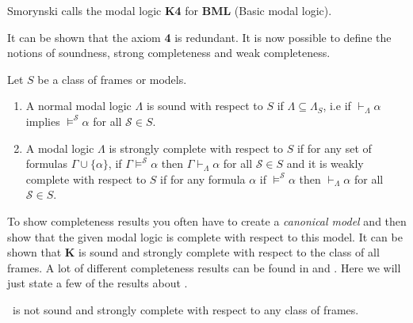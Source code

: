 \documentclass[../main.tex]{subfiles}
\begin{document}
\begin{remark}
	Smorynski calls the modal logic \textbf{K4} for \textbf{BML} (Basic
	modal logic).
\end{remark}


It can be shown that the axiom \textbf{4} is redundant.
It is now possible to define the notions of soundness, strong completeness and
weak completeness.
\begin{defi}
	Let $S$ be a class of frames or models.
	\begin{enumerate}
		\item A normal modal logic $\Lambda$ is sound with respect to $S$ if
		$\Lambda\subseteq\Lambda_S$, i.e if $\vdash_\Lambda\alpha$
		implies $\vDash^\mathcal{S}\alpha$ for all $\mathcal{S}\in S$.
	\item A modal logic $\Lambda$ is strongly complete with respect to $S$
		if for any set of formulas $\Gamma\cup\{\alpha\}$, if
		$\Gamma\vDash^\mathcal{S}\alpha$ then
		$\Gamma\vdash_\Lambda\alpha$ for all $\mathcal{S}\in S$ and it
		is weakly complete with respect to $S$ if for any formula
		$\alpha$ if $\vDash^\mathcal{S}\alpha$ then
		$\vdash_\Lambda\alpha$ for all $\mathcal{S}\in S$.
	\end{enumerate}
\end{defi}
To show completeness results you often have to create a  \textit{canonical
model} and
then show that the given modal logic is complete with respect to this model. It
can be shown that \textbf{K} is sound and strongly complete with respect to the
class of all frames. A lot of different completeness results can be found in
\citet{Lemmon1977} and \citet{Blackburn2002}. Here we will just state a few of
the results about \GL.

\begin{thm}
	\GL\ is not sound and strongly complete with respect to any class of
	frames.
\end{thm}
\end{document}
